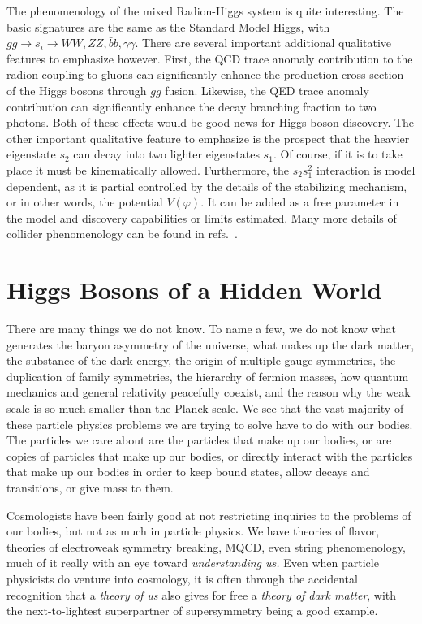 \documentclass[12pt]{article}
\def\xsection#1{\section{#1}}
\begin{document}
The phenomenology of the mixed Radion-Higgs system is quite interesting. The basic signatures are the same as the Standard Model Higgs, with $gg\to s_i\to WW,ZZ,\bar bb,\gamma\gamma$. There are several  important additional qualitative features to emphasize however. First, the QCD trace anomaly contribution to the radion coupling to gluons can significantly enhance the production cross-section of the Higgs bosons through $gg$ fusion. Likewise, the QED trace anomaly contribution can significantly enhance the decay branching fraction to two photons. Both of these effects would be good news for Higgs boson discovery. The other important qualitative feature to emphasize is the prospect that the heavier eigenstate $s_2$ can decay into two  lighter eigenstates $s_1$. Of course, if it is to take place it must be kinematically allowed. Furthermore, the $s_2s_1^2$ interaction is model dependent, as it is partial controlled by the details of the stabilizing mechanism, or in other words, the potential $V(\varphi)$.  It can be added as a free parameter in the model and discovery capabilities or limits estimated. Many more details of collider phenomenology can be found in refs.~\cite{Giudice:2000av,Csaki:2000zn,Hewett:2002nk,Gunion:2003px,Dominici:2009pq,Azatov:2008vm}.

\xsection{Higgs Bosons of a Hidden World}

There are many things we do not know. To name a few, we do not know what generates the baryon asymmetry of the universe, what makes up the dark matter, the substance of the dark energy, the origin of multiple gauge symmetries, the duplication of family symmetries, the hierarchy of fermion masses, how quantum mechanics and general relativity peacefully coexist, and the reason why the weak scale is so much smaller than the Planck scale.  We see that the vast majority of these particle physics problems we are trying to solve have to do with our bodies. The particles we care about are the particles that make up our bodies, or are copies of particles that make up our bodies, or directly interact with the particles that make up our bodies in order to keep bound states, allow decays and transitions, or give mass to them. 

Cosmologists have been fairly good at not restricting inquiries to the problems of our bodies, but not as much in particle physics. We have theories of flavor, theories of electroweak symmetry breaking, MQCD, even string phenomenology, much of it really with an eye toward {\it understanding us.}  Even when particle physicists do venture into cosmology, it is often through the accidental recognition that a {\it theory of us} also gives for free a {\it theory of dark matter}, with the next-to-lightest superpartner of supersymmetry being a good example.
\end{document}
